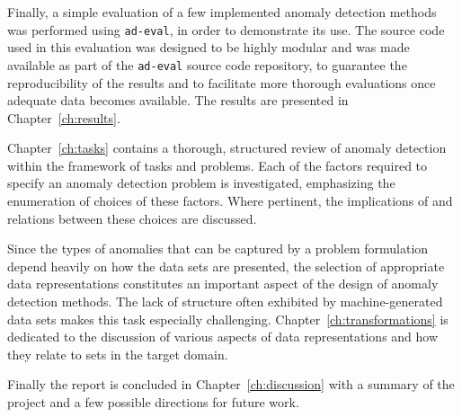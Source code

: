 Finally, a simple evaluation of a few implemented anomaly detection methods was performed using \texttt{ad-eval}, in order to demonstrate its use. The source code used in this evaluation was designed to be highly modular and was made available as part of the \texttt{ad-eval} source code repository, to guarantee the reproducibility of the results and to facilitate more thorough evaluations once adequate data becomes available. The results are presented in Chapter~\ref{ch:results}.

Chapter~\ref{ch:tasks} contains a thorough, structured review of anomaly detection within the framework of tasks and problems. Each of the factors required to specify an anomaly detection problem is investigated, emphasizing the enumeration of choices of these factors. Where pertinent, the implications of and relations between these choices are discussed.

Since the types of anomalies that can be captured by a problem formulation depend heavily on how the data sets are presented, the selection of appropriate data representations constitutes an important aspect of the design of anomaly detection methods. The lack of structure often exhibited by machine-generated data sets makes this task especially challenging. Chapter~\ref{ch:transformations} is dedicated to the discussion of various aspects of data representations and how they relate to sets in the target domain. 

Finally the report is concluded in Chapter~\ref{ch:discussion} with a summary of the project and a few possible directions for future work.
